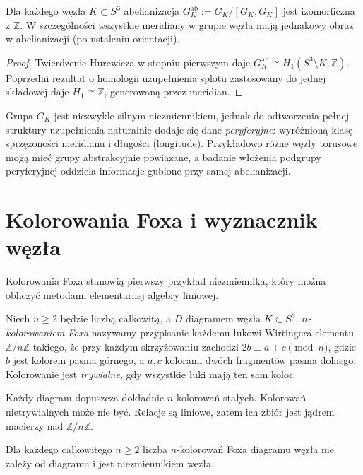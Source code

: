 \begin{stwierdzenie}
Dla każdego węzła $K\subset S^3$ abelianizacja
$G_K^{\mathrm{ab}}:=G_K/[G_K,G_K]$ jest izomorficzna z $\mathbb Z$.
W szczególności wszystkie meridiany w grupie węzła mają
jednakowy obraz w abelianizacji (po ustaleniu orientacji).
\end{stwierdzenie}

\begin{proof}
Twierdzenie Hurewicza w stopniu pierwszym daje
$G_K^{\mathrm{ab}}\cong H_1(S^3\setminus K;\mathbb Z)$.
Poprzedni rezultat o homologii uzupełnienia splotu zastosowany
do jednej składowej daje $H_1\cong\mathbb Z$, generowaną
przez meridian.
\end{proof}

\begin{uwaga}
Grupa $G_K$ jest niezwykle silnym niezmiennikiem, jednak do
odtworzenia pełnej struktury uzupełnienia naturalnie dodaje się
dane \emph{peryferyjne}: wyróżnioną klasę sprzężoności meridianu
i długości (longitude). Przykładowo różne węzły torusowe mogą
mieć grupy abstrakcyjnie powiązane, a badanie włożenia podgrupy
peryferyjnej oddziela informacje gubione przy samej abelianizacji.
\end{uwaga}

\section{Kolorowania Foxa i wyznacznik węzła}
\label{sec:kt-fox}

Kolorowania Foxa stanowią pierwszy przykład niezmiennika, który
można obliczyć metodami elementarnej algebry liniowej.

\begin{definicja}
Niech $n\geq2$ będzie liczbą całkowitą, a $D$ diagramem węzła
$K\subset S^3$. \emph{$n$-kolorowaniem Foxa} nazywamy przypisanie
każdemu łukowi Wirtingera elementu $\mathbb Z/n\mathbb Z$ takiego,
że przy każdym skrzyżowaniu zachodzi
$2b\equiv a+c\pmod n$, gdzie $b$ jest kolorem pasma górnego,
a $a,c$ kolorami dwóch fragmentów pasma dolnego.
Kolorowanie jest \emph{trywialne}, gdy wszystkie łuki mają ten sam kolor.
\end{definicja}

Każdy diagram dopuszcza dokładnie $n$ kolorowań stałych.
Kolorowań nietrywialnych może nie być. Relacje są liniowe,
zatem ich zbiór jest jądrem macierzy nad $\mathbb Z/n\mathbb Z$.

\begin{stwierdzenie}
Dla każdego całkowitego $n\geq2$ liczba $n$-kolorowań Foxa diagramu
węzła nie zależy od diagramu i jest niezmiennikiem węzła.
\end{stwierdzenie}


